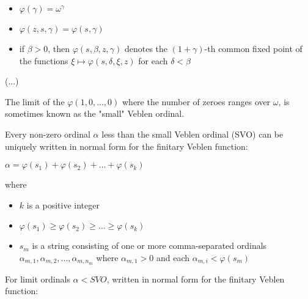 \documentclass[10pt]{article}
\begin{document}
\begin{itemize}
     \setlength{\itemsep}{1pt}
     \setlength{\parskip}{0pt}
     \setlength{\parsep}{0pt}

\item \(\varphi (\gamma )=\omega ^{\gamma }\)
\item \(\varphi (z,s,\gamma )=\varphi (s,\gamma )\)
\item if \(\beta >0\), then \(\varphi (s,\beta ,z,\gamma )\) denotes the \((1+\gamma )\)-th common fixed point of the functions \(\xi \mapsto \varphi (s,\delta ,\xi ,z)\) for each \(\delta <\beta\)

\end{itemize}

(...)

The limit of the \(\varphi(1,0,...,0)\) where the number of zeroes ranges over \( \omega \), is sometimes known as the "small" Veblen ordinal.

Every non-zero ordinal \(\alpha\) less than the small Veblen ordinal (SVO) can be uniquely written in normal form for the finitary Veblen function:

\(\alpha =\varphi (s_{1})+\varphi (s_{2})+ \ldots +\varphi (s_{k})\)

where

\begin{itemize}
     \setlength{\itemsep}{1pt}
     \setlength{\parskip}{0pt}
     \setlength{\parsep}{0pt}

\item \(k\) is a positive integer
\item \(\varphi (s_{1})\geq \varphi (s_{2})\geq \ldots \geq \varphi (s_{k})\)
\item \(s_{m}\) is a string consisting of one or more comma-separated ordinals \(\alpha _{m,1},\alpha _{m,2},...,\alpha _{m,n_{m}}\) where \(\alpha _{m,1}>0\) and each \(\alpha _{m,i}<\varphi (s_{m})\)

\end{itemize} 

For limit ordinals \(\alpha<SVO\), written in normal form for the finitary Veblen function:
\end{document}
